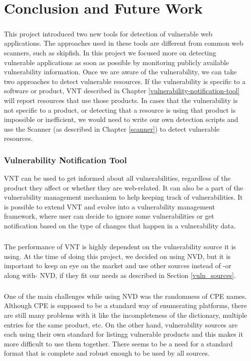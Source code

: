 \chapter{Conclusion and Future Work}
\label{conclusion-and-future-work}
\thispagestyle{empty}
\paragraph{}
This project introduced two new tools for detection of vulnerable web applications. The approaches used in these tools are different from common web scanners, such as skipfish. In this project we focused more on detecting vulnerable applications as soon as possible by monitoring publicly available vulnerability information. Once we are aware of the vulnerability, we can take two approaches to detect vulnerable resources. If the vulnerability is specific to a software or product, VNT described in Chapter \ref{vulnerability-notification-tool} will report resources that use those products. In cases that the vulnerability is not specific to a product, or detecting that a resource is using that product is impossible or inefficient, we would need to write our own detection scripts and use the Scanner (as described in Chapter \ref{scanner}) to detect vulnerable resources.
\subsection{Vulnerability Notification Tool}
VNT can be used to get informed about all vulnerabilities, regardless of the product they affect or whether they are web-related. It can also be a part of the vulnerability management mechanism to help keeping track of vulnerabilities. It is possible to extend VNT and evolve into a vulnerability management framework, where user can decide to ignore some vulnerabilities or get notification based on the type of changes that happen in a vulnerability data.
\paragraph{}
The performance of VNT is highly dependent on the vulnerability source it is using. At the time of doing this project, we decided on using NVD,  but it is important to keep an eye on the market and use other sources instead of -or along with- NVD, if they fit our needs as described in Section \ref{vuln_sources}. 
\paragraph{}
One of the main challenges while using NVD was the randomness of CPE names. Although CPE is supposed to be a standard way of enumerating platforms, there are still many problems with it like the incompleteness of the dictionary, multiple entries for the same product, etc. On the other hand, vulnerability sources are each using their own standard for listingg vulnerable products and this makes it more difficult to use them together. There seems to be a need for a standard format that is complete and robust enough to be used by all sources. 
